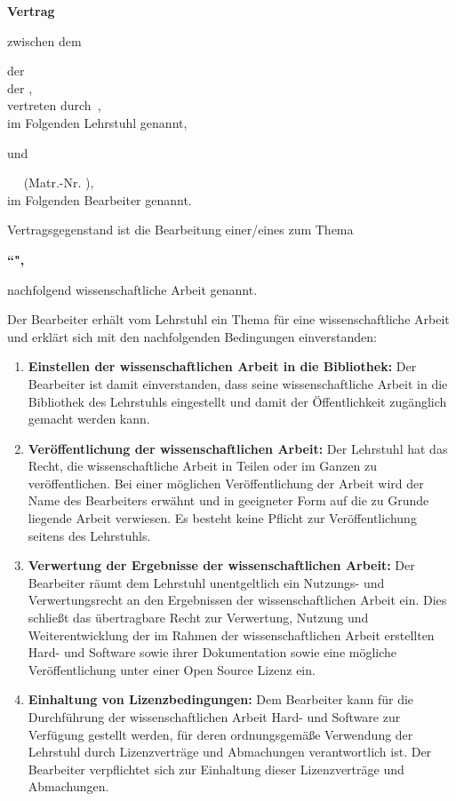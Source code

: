 \documentclass[german,11pt,a4paper]{netforms}
\begin{document}
\netformheader

\textbf{\LARGE Vertrag}

\vskip2.5mm
zwischen dem

\vskip2mm
\hfill\begin{minipage}{.9\textwidth}
\NETname{} der\\
\INname{} der \TUMname,\\
vertreten durch\
\NEThead,\\
im Folgenden \glqq{}Lehrstuhl\grqq{} genannt,
\end{minipage}

\vskip2mm
und

\vskip2mm
\hfill\begin{minipage}{.9\textwidth}
\theanrede\ \thevorname\
\textbf{\thenachname} (Matr.-Nr. \thematrikel),\\
im Folgenden \glqq{}Bearbeiter\grqq{} genannt.
\end{minipage}

\vskip5mm
Vertragsgegenstand ist die Bearbeitung einer/eines \textbf{\thetype} zum Thema
\begin{center}
	\bfseries ``\thetitleenglish",
\end{center}
nachfolgend \glqq{}wissenschaftliche Arbeit\grqq{} genannt.

\vskip5mm
Der Bearbeiter erh\"alt vom Lehrstuhl ein Thema f\"ur eine wissenschaftliche
Arbeit und erkl\"art sich mit den nachfolgenden Bedingungen einverstanden:
\begin{enumerate}
	\item \textbf{Einstellen der wissenschaftlichen Arbeit in die Bibliothek:}
	Der Bearbeiter ist damit einverstanden, dass seine wissenschaftliche Arbeit
	in die Bibliothek des Lehrstuhls eingestellt und damit der \"Offentlichkeit
	zug\"anglich gemacht werden kann.
	\item \textbf{Ver\"offentlichung der wissenschaftlichen Arbeit:}
	Der Lehrstuhl hat das Recht, die wissenschaftliche Arbeit in Teilen oder im
	Ganzen zu ver\"offentlichen.
	Bei einer m\"oglichen Ver\"offentlichung der Arbeit wird der Name des
	Bearbeiters erw\"ahnt und in geeigneter Form auf die zu Grunde liegende
	Arbeit verwiesen.
	Es besteht keine Pflicht zur Ver\"offentlichung seitens des Lehrstuhls.
	\item \textbf{Verwertung der Ergebnisse der wissenschaftlichen Arbeit:}
	Der Bearbeiter r\"aumt dem Lehrstuhl unentgeltlich ein Nutzungs- und
	Verwertungsrecht an den Ergebnissen der wissenschaftlichen Arbeit ein.
	Dies schlie\ss{}t das \"ubertragbare Recht zur Verwertung, Nutzung und
	Weiterentwicklung der im Rahmen der wissenschaftlichen Arbeit erstellten
	Hard- und Software sowie ihrer Dokumentation sowie eine m\"ogliche
	Ver\"offentlichung unter einer Open Source Lizenz ein.
	\item \textbf{Einhaltung von Lizenzbedingungen:}
	Dem Bearbeiter kann f\"ur die Durchf\"uhrung der wissenschaftlichen Arbeit
	Hard- und Software zur Verf\"ugung gestellt werden, f\"ur deren
	ordnungsgem\"a\ss{}e Verwendung der Lehrstuhl durch Lizenzvertr\"age und
	Abmachungen verantwortlich ist.
	Der Bearbeiter verpflichtet sich zur Einhaltung dieser Lizenzvertr\"age und
	Abmachungen.
\end{enumerate}
\end{document}
